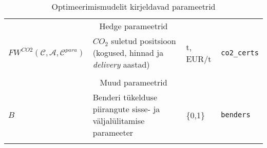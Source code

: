 \begin{landscape}
\begin{longtable}{l l l l}
\\ \multicolumn{4}{c}{Hedge parameetrid} \\
$\mathit{FW}^{CO2}(\mathcal{C}, \mathcal{A}, \mathcal{C}^{para})$ & $CO_2$ suletud positsioon (kogused, hinnad ja \emph{delivery} aastad)& t, EUR/t & \texttt{co2\_certs} \\

\\ \multicolumn{4}{c}{Muud parameetrid} \\
$\mathit{B}$ & Benderi tükelduse piirangute sisse- ja väljalülitamise parameeter & \{0,1\} & \texttt{benders} \\
  
\caption{Optimeerimismudelit kirjeldavad parameetrid \label{tab:para}} 
\end{longtable}
\normalsize
\end{landscape}
